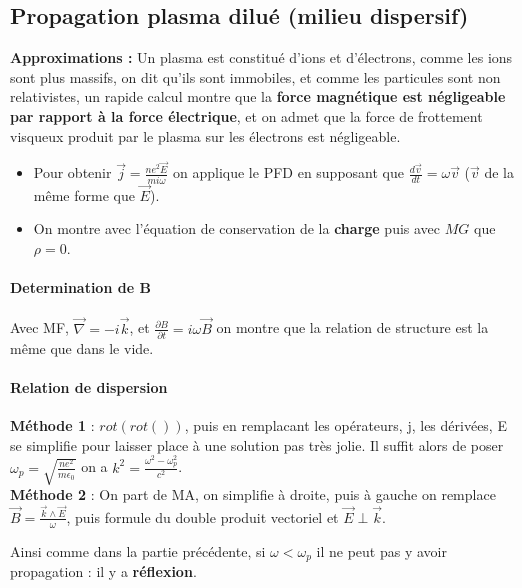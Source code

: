 \documentclass[9pt]{article}
\begin{document}
\begin{multicols*}{2}
\part*{Propagation plasma dilué (milieu dispersif)}

\textbf{Approximations :} Un plasma est constitué d'ions et d'électrons, comme les ions sont plus massifs, on dit qu'ils sont immobiles, et comme les particules sont non relativistes, un rapide calcul montre que la \textbf{force magnétique est négligeable par rapport à la force électrique}, et on admet que la force de frottement visqueux produit par le plasma sur les électrons est négligeable. 

\begin{itemize}
\item Pour obtenir $\overrightarrow{j}=\frac{ne^2\overrightarrow{E}}{mi\omega}$ on applique le PFD en supposant que $\frac{d\overrightarrow{v}}{dt}=\omega\overrightarrow{v}$ ($\overrightarrow{v}$ de la même forme que $\overrightarrow{E}$).
\item On montre avec l'équation de conservation de la \textbf{charge} puis avec $MG$ que $\rho=0$.
\end{itemize}

\subsection{Determination de B}
Avec MF, $\overrightarrow{\nabla}=-i\overrightarrow{k}$, et $\frac{\partial B}{\partial t}=i\omega\overrightarrow{B}$ on montre que la relation de structure est la même que dans le vide.

\subsection{Relation de dispersion}
\textbf{Méthode 1} : $rot(rot())$, puis en remplacant les opérateurs, j, les dérivées, E se simplifie pour laisser place à une solution pas très jolie. Il suffit alors de poser $\omega_p=\sqrt{\frac{ne^2}{m\epsilon_0}}$ on a $k^2=\frac{\omega^2-\omega_p^2}{c^2}$.\\

\textbf{Méthode 2} : On part de MA, on simplifie à droite, puis à gauche on remplace $\overrightarrow{B}=\frac{\overrightarrow{k}\wedge\overrightarrow{E}}{\omega}$, puis formule du double produit vectoriel et $\overrightarrow{E} \perp \overrightarrow{k}$.

Ainsi comme dans la partie précédente, si $\omega < \omega_p$ il ne peut pas y avoir propagation : il y a \textbf{réflexion}.\\


\end{multicols*}
\end{document}
